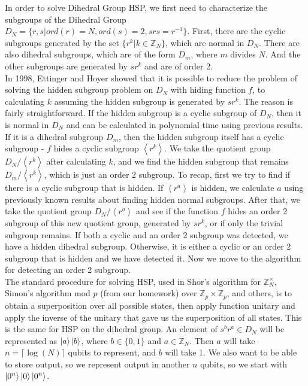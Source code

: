 \documentclass[12pt]{article}
\newcommand{\ceil}[1]{\lceil #1 \rceil}
\theoremstyle{plain}
\theoremstyle{definition}
\begin{document}
In order to solve Dihedral Group HSP, we first need to characterize the subgroups of the Dihedral Group 
$D_N=\lbrace r,s| ord(r)=N,ord(s)=2,srs=r^{-1}\rbrace$.
First, there are the cyclic subgroups generated by the set 
$\lbrace r^k|k\in\mathbb{Z}_N\rbrace$, which are normal in $D_N$.
There are also dihedral subgroups, which are of the form $D_m$, where $m$ divides $N$.
And the other subgroups are generated by $sr^k$ and are of order 2. \\
In 1998, Ettinger and Hoyer	showed that it is possible to reduce the problem of solving the hidden subgroup problem on $D_N$ with hiding function $f$, to calculating $k$ assuming the hidden subgroup is generated by $sr^k$.
The reason is fairly straightforward. If the hidden subgroup is a cyclic subgroup of $D_N$, then it is normal in $D_N$ and can be calculated in polynomial time using previous results.
If it is a dihedral subgroup $D_m$, then the hidden subgroup itself has a cyclic subgroup - $f$ hides a cyclic subgroup $\left<r^k\right>$.
We take the quotient group $D_N/\left<r^k\right>$ after calculating $k$, and we find the hidden subgroup that remains $D_m/\left<r^k\right>$, which is just an order 2 subgroup.
To recap, first we try to find if there is a cyclic subgroup that is hidden. If $\left<r^a\right>$ is hidden, we calculate $a$ using previously known results about finding hidden normal subgroups.
After that, we take the quotient group $D_N/\left<r^a\right>$ and see if the function $f$ hides an order 2 subgroup of this new quotient group, generated by $sr^k$, or if only the trivial subgroup remains.
If both a cyclic and an order 2 subgroup was detected, we have a hidden dihedral subgroup. Otherwise, it is either a cyclic or an order 2 subgroup that is hidden and we have detected it. Now we move to the algorithm for detecting an order 2 subgroup.\\
The standard procedure for solving HSP, used in Shor's algorithm for $\mathbb{Z}^\times_N$, Simon's algorithm mod $p$ (from our homework) over $\mathbb{Z}_p\times\mathbb{Z}_p$, and others, is to obtain a superposition over all possible states, then apply function unitary and apply the inverse of the unitary that gave us the superposition of all states.
This is the same for HSP on the dihedral group. An element of $s^br^a\in D_N$ will be represented as $\left\vert{a}\right\rangle\left\vert{b}\right\rangle$, where $b\in\lbrace 0,1\rbrace$ and $a\in\mathbb{Z}_N$.
Then $a$ will take $n=\ceil{\log(N)}$ qubits to represent, and $b$ will take 1. We also want to be able to store output, so we represent output in another $n$ qubits, so we start with $\left\vert{0^n}\right\rangle\left\vert{0}\right\rangle\left\vert{0^n}\right\rangle$.
\end{document}
